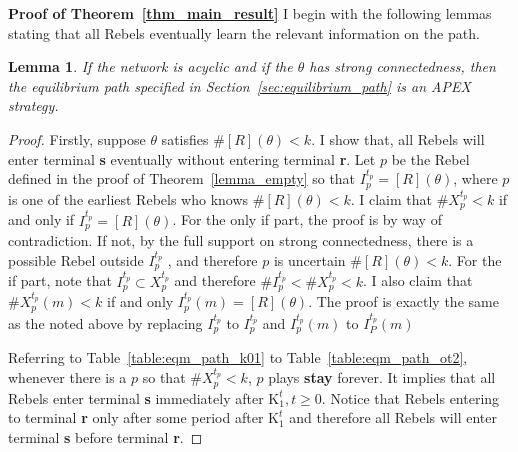 \documentclass[12pt,letter]{article}
\newcommand{\Kappa}{\mathrm{K}}
\newtheorem{lemma}{Lemma}[section]
\theoremstyle{definition}
\theoremstyle{remark}
\theoremstyle{claim}
\begin{document}
\bigskip
\noindent\textbf{Proof of Theorem~\ref{thm_main_result}}
I begin with the following lemmas stating that all Rebels eventually learn the relevant information on the path.
\begin{lemma}
\label{lemma:learning_on_the_path}
If the network is acyclic and if the $\theta$ has strong connectedness, then the equilibrium path specified in Section~\ref{sec:equilibrium_path} is an APEX strategy.
\end{lemma}
\begin{proof}
Firstly, suppose $\theta$ satisfies $\#[R](\theta)<k$. I show that, all Rebels will enter terminal \textbf{s} eventually without entering terminal \textbf{r}.  Let $p$ be the Rebel defined in the proof of Theorem~\ref{lemma_empty} so that $I^{t_p}_p=[R](\theta)$, where $p$ is one of the earliest Rebels who knows $\#[R](\theta)<k$. I claim that $\#X^{t_p}_p< k$ if and only if $I^{t_p}_p=[R](\theta)$. For the only if part, the proof is by way of contradiction. If not, by the full support on strong connectedness, there is a possible Rebel outside $I^{t_p}_p$ , and therefore $p$ is uncertain $\#[R](\theta)<k$. For the if part, note that $I^{t_p}_p\subset X^{t_p}_p$ and therefore $\#I^{t_p}_p< \#X^{t_p}_p<k$. I also claim that $\#X^{t_p}_p(m)<k$ if and only $I^{t_p}_p(m)=[R](\theta)$. The proof is exactly the same as the noted above by replacing $I^{t_p}_p$ to $I^{t_p}_p$ and $I^{t_p}_p(m)$ to $I^{t_p}_P(m)$

Referring to Table~\ref{table:eqm_path_k01} to Table~\ref{table:eqm_path_ot2}, whenever there is a $p$ so that $\#X^{t_p}_p<k$, $p$ plays \textbf{stay} forever. It implies that all Rebels enter terminal \textbf{s} immediately after $\Kappa^t_1, t\geq 0$. Notice that Rebels entering to terminal \textbf{r} only after some period after $\Kappa^t_1$ and therefore all Rebels will enter terminal \textbf{s} before terminal \textbf{r}. 


\end{proof}
\end{document}
